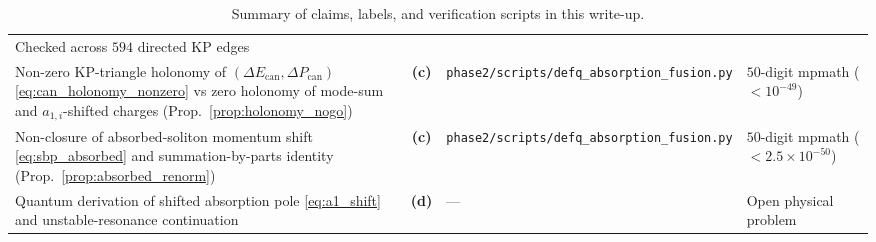 \documentclass[11pt,a4paper]{article}
\newcommand{\Lc}{\textsf{\textbf{(c)}}}
\newcommand{\Ld}{\textsf{\textbf{(d)}}}
\newcommand{\sfus}{\texttt{phase2/\allowbreak scripts/\allowbreak defq\_\allowbreak absorption\_\allowbreak fusion.py}}
\theoremstyle{remark}
\begin{document}
\begin{table}[htbp]
\begin{tabular}{@{}p{4.8cm} c p{4.6cm} p{3.8cm}@{}}
Checked across $594$ directed KP edges \\
\addlinespace
Non-zero KP-triangle holonomy of $(\Delta E_{\mathrm{can}},\Delta P_{\mathrm{can}})$ \eqref{eq:can_holonomy_nonzero} vs zero holonomy of mode-sum and $a_{1,i}$-shifted charges (Prop.~\ref{prop:holonomy_nogo}) &
\Lc & \sfus &
$50$-digit mpmath ($<10^{-49}$) \\
\addlinespace
Non-closure of absorbed-soliton momentum shift \eqref{eq:sbp_absorbed} and summation-by-parts identity (Prop.~\ref{prop:absorbed_renorm}) &
\Lc & \sfus &
$50$-digit mpmath ($<2.5\times 10^{-50}$) \\
\addlinespace
Quantum derivation of shifted absorption pole \eqref{eq:a1_shift} and unstable-resonance continuation &
\Ld & --- &
Open physical problem \\
\bottomrule
\end{tabular}
\caption{Summary of claims, labels, and verification scripts in this write-up.}
\label{tab:summary}
\end{table}
\end{document}
